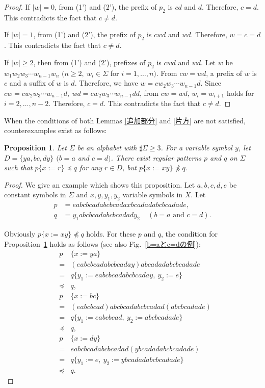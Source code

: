 \begin{proof}
%
If $|w|=0$, from (1') and (2'), the prefix of $p_{2}$ is $cd$ and $d$.
Therefore, $c=d$. This contradicts the fact that $c \not = d$.

If $|w|=1$, from (1') and (2'), the prefix of $p_{2}$ is $cwd$ and $wd$.
Therefore, $w=c=d$.
This contradicts the fact that $c \not = d$.

If $|w| \ge 2$, then from (1') and (2'),  prefixes of $p_{2}$ is $cwd$ and $wd$.
Let $w$ be $w_{1}w_{2}w_{3} \cdots w_{n-1}w_{n}$ $(n\geq 2,~w_{i}\in\Sigma$ for $i=1, \ldots , n)$.
From $cw=wd$, a prefix of $w$ is $c$ and a suffix of $w$ is $d$.
Therefore, we have $w=cw_{2}w_{3} \cdots w_{n-1}d$.
Since $cw=cw_{2}w_{3} \cdots w_{n-1}d,~wd=cw_{2}w_{3} \cdots w_{n-1}dd$, from $cw=wd$, $w_{i}=w_{i+1}$ holds for $i=2, \ldots , n-2$.
Therefore, $c=d$. This contradicts the fact that $c \not = d$.
\end{proof}

When the conditions of both Lemmas \ref{追加部分} and \ref{片方} are not satisfied, counterexamples exist as follows:

\newtheorem{prop}{Proposition}

\begin{prop}\label{両方}
  Let $\Sigma$ be an alphabet with $\sharp \Sigma \ge 3$.
  For a variable symbol $y$, let $D= \{ ya, bc, dy \}$ $(b = a$ and $c = d)$. There exist regular patterns $p$ and $q$ on $\Sigma$ such that $p \{ x := r \} \preceq q$ for any $r \in D$, but $p \{ x := xy \} \not \preceq q$.
\end{prop}

\begin{proof}
We give an example which shows this proposition.
Let $a,b,c,d,e$ be constant symbols in $\Sigma$ and 
$x,y,y_{1},y_{2}$ variable symbols in $X$.
Let 
\begin{align*}
p &= eabcbcadabcbcadaxbcadadabcbcadade,\\
q &= y_{1}abcbcadabcbcadady_{2}~~~~~(b = a\mbox{~and~}c = d).
\end{align*}

\noindent
Obviously $p \{ x:=xy \} \not \preceq q$ holds.
For these $p$ and $q$, the condition for Proposition~\ref{両方} holds as follows (see also Fig.~\ref{b=aとc=dの例}):
\begin{eqnarray*}
&p& \{ x:=ya \} \\ 
& = & (eabcbcadabcbcaday)abcadadabcbcadade\\
& = & q \{ y_{1} := eabcbcadabcbcaday,~y_{2}:=e \} \\
& \preceq & q,\\
&p& \{ x:=bc \}  \\
& = & (eabcbcad)abcbcadabcbcadad(abcbcadade) \\
& = & q \{ y_{1} := eabcbcad,~y_{2} := abcbcadade \} \\
& \preceq & q,\\
&p& \{ x:=dy \}  \\
& = & eabcbcadabcbcadad(ybcadadabcbcadade) \\
& = & q \{ y_{1}:=e,~y_{2} := ybcadadabcbcadade \} \\
& \preceq & q.
\end{eqnarray*}
\end{proof}

